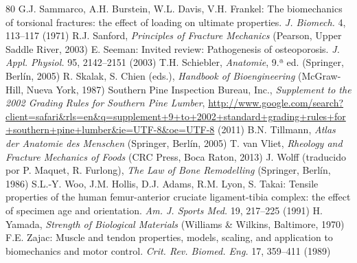 \documentclass[12pt]{book}
\begin{document}
\begin{thebibliography}{80}
   G.J. Sammarco, A.H. Burstein, W.L. Davis, V.H. Frankel: The biomechanics of torsional fractures: the effect of loading on ultimate properties. \textit{J. Biomech.} 4, 113--117 (1971)
   R.J. Sanford, \textit{Principles of Fracture Mechanics} (Pearson, Upper Saddle River, 2003)
   E. Seeman: Invited review: Pathogenesis of osteoporosis. \textit{J. Appl. Physiol.} 95, 2142--2151 (2003)
   T.H. Schiebler, \textit{Anatomie}, 9.ª ed. (Springer, Berlín, 2005)
   R. Skalak, S. Chien (eds.), \textit{Handbook of Bioengineering} (McGraw-Hill, Nueva York, 1987)
   Southern Pine Inspection Bureau, Inc., \textit{Supplement to the 2002 Grading Rules for Southern Pine Lumber}, \url{http://www.google.com/search?client=safari&rls=en&q=supplement+9+to+2002+standard+grading+rules+for+southern+pine+lumber&ie=UTF-8&oe=UTF-8} (2011)
   B.N. Tillmann, \textit{Atlas der Anatomie des Menschen} (Springer, Berlín, 2005)
   T. van Vliet, \textit{Rheology and Fracture Mechanics of Foods} (CRC Press, Boca Raton, 2013)
   J. Wolff (traducido por P. Maquet, R. Furlong), \textit{The Law of Bone Remodelling} (Springer, Berlín, 1986)
   S.L.-Y. Woo, J.M. Hollis, D.J. Adams, R.M. Lyon, S. Takai: Tensile properties of the human femur-anterior cruciate ligament-tibia complex: the effect of specimen age and orientation. \textit{Am. J. Sports Med.} 19, 217--225 (1991)
   H. Yamada, \textit{Strength of Biological Materials} (Williams \& Wilkins, Baltimore, 1970)
   F.E. Zajac: Muscle and tendon properties, models, scaling, and application to biomechanics and motor control. \textit{Crit. Rev. Biomed. Eng.} 17, 359--411 (1989)
\end{thebibliography}

\end{document}
